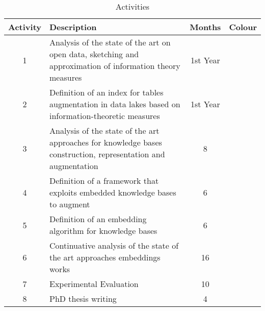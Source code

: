 \begin{table}[h!]\footnotesize
    \centering
    
    \caption{Activities\label{table1}}
    \begin{tabular}{|c|p{9cm}|c|c|}
        \hline
        \textbf{Activity} & \textbf{Description} & \textbf{Months} & \textbf{Colour}\\ \hline
        1 & Analysis of the state of the art on open data, sketching and approximation of information theory measures & 1st Year & \cellcolor{lightgreen} \\\hline
        2 & Definition of an index for tables augmentation in data lakes based on information-theoretic measures& 1st Year & \cellcolor{green} \\\hline
        3 & Analysis of the state of the art approaches for knowledge bases construction, representation and augmentation & 8 & \cellcolor{lightyellow} \\\hline
        4 & Definition of a framework that exploits embedded knowledge bases to augment & 6 & \cellcolor{orange} \\\hline
        5 & Definition of an embedding algorithm for knowledge bases & 6 & \cellcolor{red} \\\hline
        6 & Continuative analysis of the state of the art approaches embeddings works & 16 & \cellcolor{cyan} \\\hline
        7 & Experimental Evaluation & 10 & \cellcolor{blue} \\\hline
        8 & PhD thesis writing & 4 & \cellcolor{blue-violet} \\\hline
    \end{tabular}
\end{table}
    
    \bigbreak
    \vspace{-2em}
    
